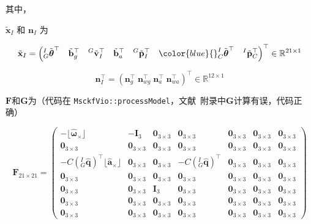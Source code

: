 \documentclass[12pt,a4paper]{article}
\begin{document}
其中，

$\tilde{\mathbf{x}}_{I}$ 和 $\mathbf{n}_I$ 为

$$
\tilde{\mathbf{x}}_{I} = 
\left(
{}^I_G \tilde{\boldsymbol{\theta}}^\top \quad 
\tilde{\mathbf{b}}_g^\top \quad 
{}^G\tilde{\mathbf{v}}^\top_I \quad 
\tilde{\mathbf{b}}_a^\top \quad
{}^G\tilde{\mathbf{p}}^\top_I \quad
{\color{blue}
{}^I_C \tilde{\boldsymbol{\theta}}^\top \quad
{}^I\tilde{\mathbf{p}}^\top_C}
\right)^\top 
\in \mathbb{R}^{21 \times 1}
$$

$$
\mathbf{n}_I^\top = 
\left(\mathbf{n}_g^\top \; \mathbf{n}_{wg}^\top \; \mathbf{n}_a^\top \; \mathbf{n}_{wa}^\top\right)^\top
\in \mathbb{R}^{12 \times 1}
$$

$\mathbf{F}$和$\mathbf{G}$为（代码在 \verb|MsckfVio::processModel|，文献~\citep{sun2018robust}附录中$\mathbf{G}$计算有误，代码正确）

\begin{equation*}
\mathbf{F}_{21 \times 21} = 
\begin{pmatrix}
-\lfloor\hat{\boldsymbol{\omega}}{}_{\times}\rfloor & -\mathbf{I}_3 & 
\mathbf{0}_{3\times 3} & \mathbf{0}_{3\times 3} & \mathbf{0}_{3\times 3} & \mathbf{0}_{3\times 3} & \mathbf{0}_{3\times 3} \\
\mathbf{0}_{3\times 3} & \mathbf{0}_{3\times 3} & \mathbf{0}_{3\times 3} & 
\mathbf{0}_{3\times 3} & \mathbf{0}_{3\times 3} & \mathbf{0}_{3\times 3} & \mathbf{0}_{3\times 3} \\
-C\left({}^I_G\hat{\mathbf{q}}\right)^\top\lfloor\hat{\mathbf{a}}{}_{\times}\rfloor & 
\mathbf{0}_{3\times 3} & \mathbf{0}_{3\times 3} & 
-C\left({}^I_G\hat{\mathbf{q}}\right)^\top & \mathbf{0}_{3\times 3} & \mathbf{0}_{3\times 3} & \mathbf{0}_{3\times 3} \\
\mathbf{0}_{3\times 3} & \mathbf{0}_{3\times 3} & \mathbf{0}_{3\times 3} & 
\mathbf{0}_{3\times 3} & \mathbf{0}_{3\times 3} & \mathbf{0}_{3\times 3} & \mathbf{0}_{3\times 3} \\
\mathbf{0}_{3\times 3} & \mathbf{0}_{3\times 3} & \mathbf{I}_3 & 
\mathbf{0}_{3\times 3} & \mathbf{0}_{3\times 3} & \mathbf{0}_{3\times 3} & \mathbf{0}_{3\times 3} \\
\mathbf{0}_{3\times 3} & \mathbf{0}_{3\times 3} & \mathbf{0}_{3\times 3} & 
\mathbf{0}_{3\times 3} & \mathbf{0}_{3\times 3} & \mathbf{0}_{3\times 3} & \mathbf{0}_{3\times 3} \\
\mathbf{0}_{3\times 3} & \mathbf{0}_{3\times 3} & \mathbf{0}_{3\times 3} & 
\mathbf{0}_{3\times 3} & \mathbf{0}_{3\times 3} & \mathbf{0}_{3\times 3} & \mathbf{0}_{3\times 3}
\end{pmatrix}
\end{equation*}
\end{document}
